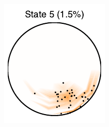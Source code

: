 \documentclass[aos,noinfoline]{imsart} %
\begin{document}
\begin{figure}[t!]
\begin{subfigure}[T]{1.2in}
  \end{subfigure}
    ~
  \begin{subfigure}[T]{1.2in}
    \includegraphics[width=\textwidth]{state5}
  \end{subfigure}
  \\
    \begin{subfigure}[T]{1.2in}

\end{subfigure}
\end{figure}
\end{document}

